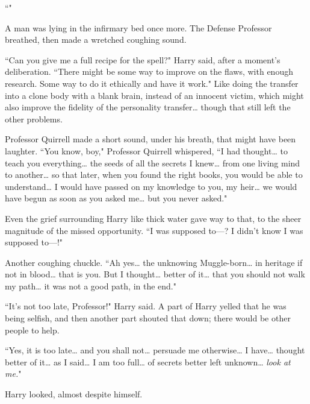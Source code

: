 ``"

A man was lying in the infirmary bed once more. The Defense Professor breathed, then made a wretched coughing sound.

``Can you give me a full recipe for the spell?" Harry said, after a moment's deliberation. ``There might be some way to improve on the flaws, with enough research. Some way to do it ethically and have it work." Like doing the transfer into a clone body with a blank brain, instead of an innocent victim, which might also improve the fidelity of the personality transfer{\ldots} though that still left the other problems.

Professor Quirrell made a short sound, under his breath, that might have been laughter. ``You know, boy," Professor Quirrell whispered, ``I had thought{\ldots} to teach you everything{\ldots} the seeds of all the secrets I knew{\ldots} from one living mind to another{\ldots} so that later, when you found the right books, you would be able to understand{\ldots} I would have passed on my knowledge to you, my heir{\ldots} we would have begun as soon as you asked me{\ldots} but you never asked."

Even the grief surrounding Harry like thick water gave way to that, to the sheer magnitude of the missed opportunity. ``I was supposed to—? I didn't know I was supposed to—!"

Another coughing chuckle. ``Ah yes{\ldots} the unknowing Muggle-born{\ldots} in heritage if not in blood{\ldots} that is you. But I thought{\ldots} better of it{\ldots} that you should not walk my path{\ldots} it was not a good path, in the end."

``It's not too late, Professor!" Harry said. A part of Harry yelled that he was being selfish, and then another part shouted that down; there would be other people to help.

``Yes, it is too late{\ldots} and you shall not{\ldots} persuade me otherwise{\ldots} I have{\ldots} thought better of it{\ldots} as I said{\ldots} I am too full{\ldots} of secrets better left unknown{\ldots} \emph{look at me.}"

Harry looked, almost despite himself.


